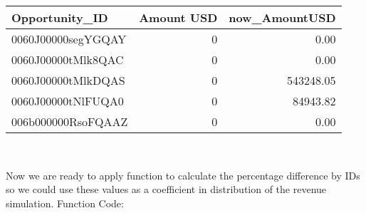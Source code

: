 \documentclass[]{article}
\begin{document}
\begin{tabular}{l|r|r}
\hline
Opportunity\_ID & Amount USD & now\_AmountUSD\\
\hline
0060J00000segYGQAY & 0 & 0.00\\
\hline
0060J00000tMlk8QAC & 0 & 0.00\\
\hline
0060J00000tMlkDQAS & 0 & 543248.05\\
\hline
0060J00000tNlFUQA0 & 0 & 84943.82\\
\hline
006b000000RsoFQAAZ & 0 & 0.00\\
\hline
\end{tabular}

~

Now we are ready to apply function to calculate the percentage
difference by IDs so we could use these values as a coefficient in
distribution of the revenue simulation. Function Code:
\end{document}
